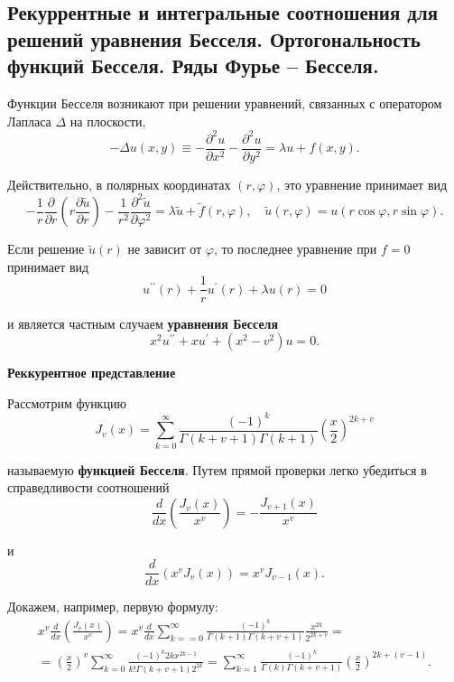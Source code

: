\subsection{Рекуррентные и интегральные соотношения для решений уравнения Бесселя. Ортогональность функций Бесселя. Ряды Фурье – Бесселя.}
Функции Бесселя возникают при решении уравнений, связанных с оператором Лапласа $\Delta$ на плоскости,
\[
-\Delta u(x, y) \equiv-\frac{\partial^{2} u}{\partial x^{2}}-\frac{\partial^{2} u}{\partial y^{2}}=\lambda u+f(x, y) .
\]

Действительно, в полярных координатах $(r, \varphi)$, это уравнение принимает вид
\[
-\frac{1}{r} \frac{\partial}{\partial r}\left(r \frac{\partial \widetilde{u}}{\partial r}\right)-\frac{1}{r^{2}} \frac{\partial^{2} \widetilde{u}}{\partial \varphi^{2}}=\lambda \widetilde{u}+\widetilde{f}(r, \varphi), \quad \widetilde{u}(r, \varphi)=u(r \cos \varphi, r \sin \varphi) .
\]

Если решение $\widetilde{u}(r)$ не зависит от $\varphi$, то последнее уравнение при $f=0$ принимает вид
\[
u^{\prime \prime}(r)+\frac{1}{r} u^{\prime}(r)+\lambda u(r)=0
\]

и является частным случаем \textbf{уравнения Бесселя}
\[
x^{2} u^{\prime \prime}+x u^{\prime}+\left(x^{2}-v^{2}\right) u=0 .
\]

\textbf{Реккурентное представление}

Рассмотрим функцию
\[
J_v(x) = \sum_{k=0}^{\infty}\frac{(-1)^k}{\Gamma(k+v+1)\Gamma(k+1)} \left(\frac{x}{2}\right)^{2k+v}
\]

называемую \textbf{функцией Бесселя}. Путем прямой проверки легко убедиться в справедливости соотношений
\[
\frac{d}{d x}\left(\frac{J_{v}(x)}{x^{v}}\right)=-\frac{J_{v+1}(x)}{x^{v}}
\]

и
\[
\frac{d}{d x}\left(x^{v} J_{v}(x)\right)=x^{v} J_{v-1}(x) .
\]

Докажем, например, первую формулу:
\[
\begin{aligned}
	x^{v} \frac{d}{d x}\left(\frac{J_{v}(x)}{x^{v}}\right)=x^{v} \frac{d}{d x} \sum_{k==0}^{\infty} \frac{(-1)^{k}}{\Gamma(k+1) \Gamma(k+v+1)} \frac{x^{2 k}}{2^{2 k+v}}= \\
	=\left(\frac{x}{2}\right)^{v} \sum_{k=0}^{\infty} \frac{(-1)^{k} 2 k x^{2 k-1}}{k ! \Gamma(k+v+1) 2^{2 k}}=\sum_{k=1}^{\infty} \frac{(-1)^{k}}{\Gamma(k) \Gamma(k+v+1)}\left(\frac{x}{2}\right)^{2 k+(v-1)} .
\end{aligned}
\]

